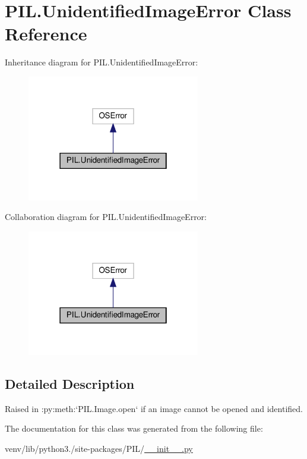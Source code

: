 \hypertarget{classPIL_1_1UnidentifiedImageError}{}\section{P\+I\+L.\+Unidentified\+Image\+Error Class Reference}
\label{classPIL_1_1UnidentifiedImageError}


Inheritance diagram for P\+I\+L.\+Unidentified\+Image\+Error\+:
\nopagebreak
\begin{figure}[H]
\begin{center}
\leavevmode
\includegraphics[width=214pt]{classPIL_1_1UnidentifiedImageError__inherit__graph}
\end{center}
\end{figure}


Collaboration diagram for P\+I\+L.\+Unidentified\+Image\+Error\+:
\nopagebreak
\begin{figure}[H]
\begin{center}
\leavevmode
\includegraphics[width=214pt]{classPIL_1_1UnidentifiedImageError__coll__graph}
\end{center}
\end{figure}


\subsection{Detailed Description}
\begin{DoxyVerb}Raised in :py:meth:`PIL.Image.open` if an image cannot be opened and identified.
\end{DoxyVerb}
 

The documentation for this class was generated from the following file\+:\begin{DoxyCompactItemize}
\item 
venv/lib/python3./site-\/packages/\+P\+I\+L/\hyperlink{venv_2lib_2python3_89_2site-packages_2PIL_2____init_____8py}{\+\_\+\+\_\+init\+\_\+\+\_\+.\+py}\end{DoxyCompactItemize}
